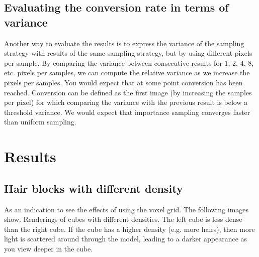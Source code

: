 \documentclass[11pt,a4paper]{report}
\begin{document}
\section{Evaluating the conversion rate in terms of variance}

Another way to evaluate the results is to express the variance of the sampling strategy with results of the same sampling strategy, but by using different pixels per sample. By comparing the variance between consecutive results for 1, 2, 4, 8, etc. pixels per samples, we can compute the relative variance as we increase the pixels per samples. You would expect that at some point conversion has been reached. Conversion can be defined as the first image (by increasing the samples per pixel) for which comparing the variance with the previous result is below a threshold variance. We would expect that importance sampling converges faster than uniform sampling.


\chapter{Results}

\section{Hair blocks with different density}

As an indication to see the effects of using the voxel grid. The following images show.
Renderings of cubes with different densities. The left cube is less dense than the right cube. If the cube has a higher density (e.g. more hairs), then more light is scattered around through the model, leading to a darker appearance as you view deeper in the cube.
\end{document}

